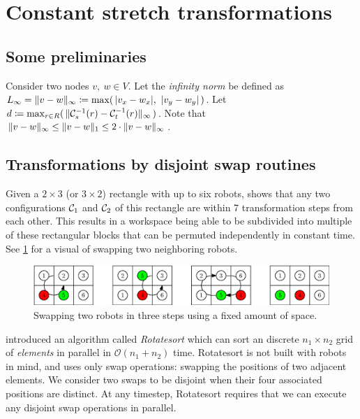 \section{Constant stretch transformations}\label{chapter:constant_stretch}

\subsection{Some preliminaries}

Consider two nodes \(v,\ w \in V\). 
Let the \emph{infinity norm} be defined as \(L_\infty = \lVert v - w\rVert_\infty \coloneqq \max(\, \lvert v_x - w_x\rvert,\ \lvert v_y - w_y\rvert \,)\). 
Let \(d \coloneqq \max_{r \in R}(\, \lVert\mathcal{C}_{s}^{-1}(r) - \mathcal{C}_{t}^{-1}(r)\rVert_\infty \,)\). 
Note that \(\lVert v - w\rVert_\infty \leq \lVert v - w\rVert_1 \leq 2\cdot \lVert v - w\rVert_\infty\).

\subsection{Transformations by disjoint swap routines}

Given a \(2 \times 3\) (or \(3 \times 2\)) rectangle with up to six robots, \cite{siamcomp/DemaineFKMS19} shows that any two configurations \(\mathcal{C}_{1}\) and \(\mathcal{C}_{2}\) of this rectangle are within 7 transformation steps from each other. 
This results in a workspace being able to be subdivided into multiple of these rectangular blocks that can be permuted independently in constant time.
See \cref{fig:swap3} for a visual of swapping two neighboring robots.

\begin{figure}[h]
	\centering
	\includegraphics[width=0.8\linewidth]{ipe/swap_ex.eps}
	\caption{
		Swapping two robots in three steps using a fixed amount of space.
	}\label{fig:swap3}
\end{figure}

\cite{algorithmica/MarbergG88} introduced an algorithm called \emph{Rotatesort} which can sort an discrete \(n_1 \times n_2\) grid of \emph{elements} in parallel in \(\mathcal{O}(n_1 + n_2)\) time.
Rotatesort is not built with robots in mind, and uses only swap operations: swapping the positions of two adjacent elements.
We consider two swaps to be disjoint when their four associated positions are distinct.
At any timestep, Rotatesort requires that we can execute any disjoint swap operations in parallel.

